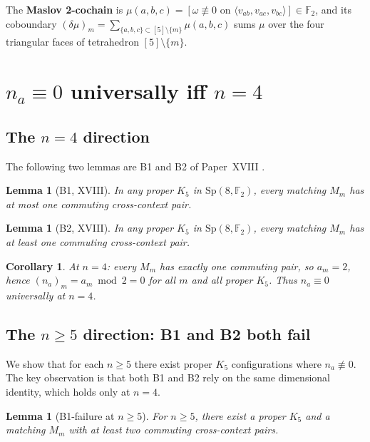 \documentclass[11pt,a4paper]{article}
\newcommand{\Sp}{\mathrm{Sp}}
\newcommand{\F}{\mathbb{F}}
\theoremstyle{plain}
\newtheorem{lemma}[theorem]{Lemma}
\newtheorem{corollary}[theorem]{Corollary}
\theoremstyle{definition}
\theoremstyle{remark}
\begin{document}
The \textbf{Maslov 2-cochain} is $\mu(a,b,c) = [\omega \not\equiv 0
\text{ on }\langle v_{ab},v_{ac},v_{bc}\rangle] \in \F_2$, and its
coboundary $(\delta\mu)_m = \sum_{\{a,b,c\} \subset [5]\setminus\{m\}} \mu(a,b,c)$
sums $\mu$ over the four triangular faces of tetrahedron $[5]\setminus\{m\}$.

\section{\texorpdfstring{\boldmath$n_a \equiv 0$ universally iff $n = 4$}{Part A: n\_a≡0 universally iff n=4}}
\label{sec:partA}

\subsection{\texorpdfstring{The $n = 4$ direction}{The n=4 direction}}

The following two lemmas are B1 and B2 of Paper~XVIII \cite{PaperXVIII}.

\begin{lemma}[B1, XVIII]\label{lem:B1}
In any proper $K_5$ in $\Sp(8,\F_2)$, every matching $M_m$ has at most
one commuting cross-context pair.
\end{lemma}

\begin{lemma}[B2, XVIII]\label{lem:B2}
In any proper $K_5$ in $\Sp(8,\F_2)$, every matching $M_m$ has at least
one commuting cross-context pair.
\end{lemma}

\begin{corollary}\label{cor:n4}
At $n = 4$: every $M_m$ has exactly one commuting pair,
so $a_m = 2$, hence $(n_a)_m = a_m \bmod 2 = 0$ for all $m$
and all proper $K_5$.
Thus $n_a \equiv 0$ universally at $n = 4$.
\end{corollary}

\subsection{\texorpdfstring{The $n \geq 5$ direction: B1 and B2 both fail}{The n≥5 direction: B1 and B2 both fail}}

We show that for each $n \geq 5$ there exist proper $K_5$ configurations
where $n_a \not\equiv 0$.
The key observation is that both B1 and B2 rely on the same
dimensional identity, which holds only at $n = 4$.

\begin{lemma}[B1-failure at $n \geq 5$]\label{lem:B1fail}
For $n \geq 5$, there exist a proper $K_5$ and a matching $M_m$ with at
least two commuting cross-context pairs.
\end{lemma}
\end{document}
